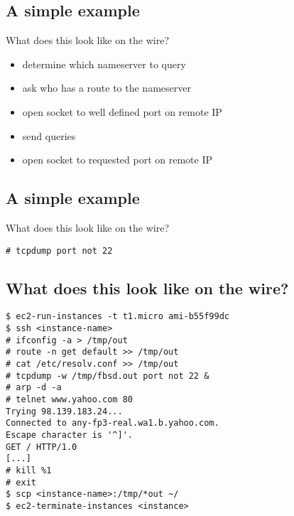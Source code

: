 \documentclass[xga]{xdvislides}
\begin{document}
%
\Normalsize

\subsection{A simple example}
What does this look like on the wire?
\\

\begin{itemize}
	\item determine which nameserver to query
	\item ask who has a route to the nameserver
	\item open socket to well defined port on remote IP
	\item send queries
	\item open socket to requested port on remote IP
\end{itemize}

\subsection{A simple example}
What does this look like on the wire?
\vspace*{1in}
\\
\Hugesize
\begin{center}
\begin{verbatim}
# tcpdump port not 22
\end{verbatim}
\end{center}
\Normalsize
\vspace*{\fill}

\subsection{What does this look like on the wire?}
\begin{verbatim}
$ ec2-run-instances -t t1.micro ami-b55f99dc
$ ssh <instance-name>
# ifconfig -a > /tmp/out
# route -n get default >> /tmp/out
# cat /etc/resolv.conf >> /tmp/out
# tcpdump -w /tmp/fbsd.out port not 22 &
# arp -d -a
# telnet www.yahoo.com 80
Trying 98.139.183.24...
Connected to any-fp3-real.wa1.b.yahoo.com.
Escape character is '^]'.
GET / HTTP/1.0
[...]
# kill %1
# exit
$ scp <instance-name>:/tmp/*out ~/
$ ec2-terminate-instances <instance>
\end{verbatim}
\end{document}
